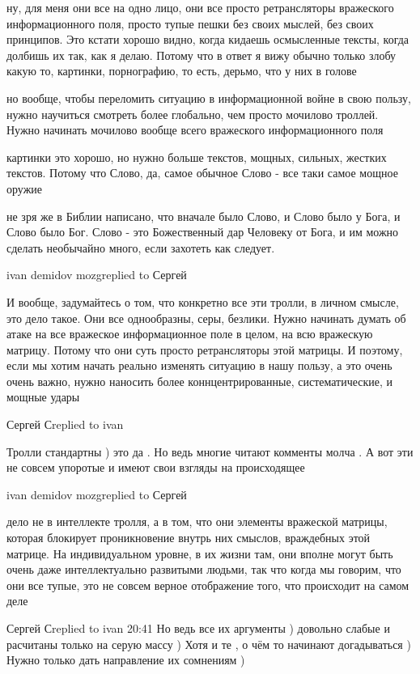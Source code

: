 ну, для меня они все на одно лицо, они все просто ретрансляторы вражеского
информационного поля, просто тупые пешки без своих мыслей, без своих принципов.
Это кстати хорошо видно, когда кидаешь осмысленные тексты, когда долбишь их
так, как я делаю. Потому что в ответ я вижу обычно только злобу какую то,
картинки, порнографию, то есть, дерьмо, что у них в голове

но вообще, чтобы переломить ситуацию в информационной войне в свою пользу,
нужно научиться смотреть более глобально, чем просто мочилово троллей. Нужно
начинать мочилово вообще всего вражеского информационного поля

картинки это хорошо, но нужно больше текстов, мощных, сильных, жестких текстов.
Потому что Слово, да, самое обычное Слово - все таки самое мощное оружие

не зря же в Библии написано, что вначале было Слово, и Слово было у Бога, и
Слово было Бог. Слово - это Божественный дар Человеку от Бога, и им можно
сделать необычайно много, если захотеть как следует.

ivan demidov mozgreplied to Сергей

И вообще, задумайтесь о том, что конкретно все эти тролли, в личном смысле, это
дело такое. Они все однообразны, серы, безлики. Нужно начинать думать об атаке
на все вражеское информационное поле в целом, на всю вражескую матрицу. Потому
что они суть просто ретрансляторы этой матрицы. И поэтому, если мы хотим начать
реально изменять ситуацию в нашу пользу, а это очень очень важно, нужно
наносить более коннцентрированные, систематические, и мощные удары

Сергей Сreplied to ivan

Тролли стандартны ) это да . Но ведь многие читают комменты молча . А вот эти
не совсем упоротые и имеют свои взгляды на происходящее

ivan demidov mozgreplied to Сергей

дело не в интеллекте тролля, а в том, что они элементы вражеской матрицы,
которая блокирует проникновение внутрь них смыслов, враждебных этой матрице. На
индивидуальном уровне, в их жизни там, они вполне могут быть очень даже
интеллектуально развитыми людьми, так что когда мы говорим, что они все тупые,
это не совсем верное отображение того, что происходит на самом деле

Сергей Сreplied to ivan
20:41
Но ведь все их аргументы ) довольно слабые и расчитаны только на серую массу ) Хотя и те , о чём то начинают догадываться ) Нужно только дать направление их сомнениям )


